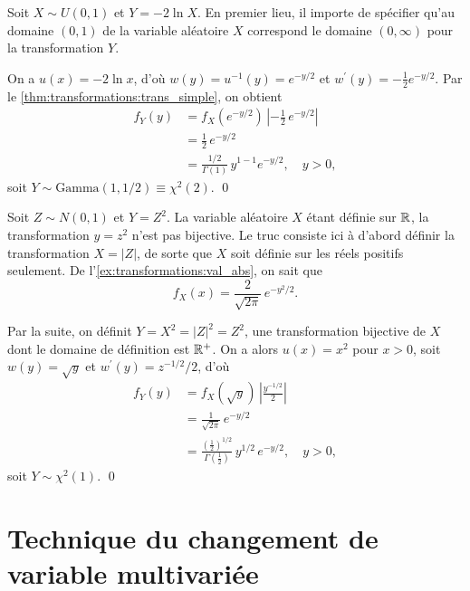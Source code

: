 \begin{exemple}
  Soit $X \sim U(0, 1)$ et $Y = -2 \ln X$. En premier lieu, il importe
  de spécifier qu'au domaine $(0, 1)$ de la variable aléatoire $X$
  correspond le domaine $(0, \infty)$ pour la transformation $Y$.

  On a $u(x) = -2 \ln x$, d'où $w(y) = u^{-1}(y) = e^{-y/2}$ et
  $w^\prime(y) = -\frac{1}{2} e^{-y/2}$. Par le \autoref{thm:transformations:trans_simple}, on obtient
  \begin{align*}
    f_Y(y)
    &= f_X(e^{-y/2})\,
    \left|
      - \frac{1}{2}\, e^{-y/2}
    \right| \\
    &= \frac{1}{2}\, e^{-y/2} \\
    &= \frac{1/2}{\Gamma(1)}\, y^{1 - 1} e^{-y/2}, \quad y > 0,
  \end{align*}
  soit $Y \sim \text{Gamma}(1, 1/2) \equiv \chi^2(2)$.
  \qed
\end{exemple}

\begin{exemple}
  Soit $Z \sim N(0, 1)$ et $Y = Z^2$. La variable aléatoire $X$ étant
  définie sur $\mathbb{R}$, la transformation $y = z^2$ n'est pas bijective.
  Le truc consiste ici à d'abord définir la transformation $X = |Z|$,
  de sorte que $X$ soit définie sur les réels positifs seulement. De
  l'\autoref{ex:transformations:val_abs}, on sait que
  \begin{displaymath}
    f_X(x) = \frac{2}{\sqrt{2\pi}}\, e^{-y^2/2}.
  \end{displaymath}

  Par la suite, on définit $Y = X^2 = |Z|^2 = Z^2$, une transformation
  bijective de $X$ dont le domaine de définition est $\mathbb{R}^+$. On a
  alors $u(x) = x^2$ pour $x > 0$, soit $w(y) = \sqrt{y}$ et
  $w^\prime(y) = z^{-1/2}/2$, d'où
  \begin{align*}
    f_Y(y)
    &= f_X(\sqrt{y})\,
    \left|
      \frac{y^{-1/2}}{2}
    \right| \\
    &= \frac{1}{\sqrt{2\pi}}\, e^{-y/2} \\
    &= \frac{(\frac{1}{2})^{1/2}}{\Gamma(\frac{1}{2})}\, y^{1/2}\,
    e^{-y/2}, \quad y > 0,
  \end{align*}
  soit $Y \sim \chi^2(1)$.
  \qed
\end{exemple}



\section{Technique du changement de variable multivariée}

